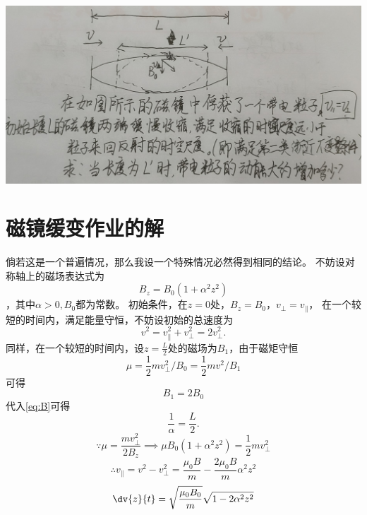 
\includegraphics[width=\textwidth]{figures/2022-10-21T120911+0800.png}
\section{磁镜缓变作业的解}
倘若这是一个普遍情况，那么我设一个特殊情况必然得到相同的结论。
不妨设对称轴上的磁场表达式为
\begin{equation}
B_z = B_0 (1 + \alpha^2 z^2)
\label{eq:B}
\end{equation}
，其中\(\alpha>0, B_0\)都为常数。
初始条件，在\(z=0\)处，\(B_z = B_0\)，\( v_\perp = v_\parallel\)，
在一个较短的时间内，满足能量守恒，不妨设初始的总速度为
\begin{equation}
  v^2 = v_\parallel^2 + v_\perp^2 = 2 v_\perp^2.
\end{equation}
同样，在一个较短的时间内，设\(z=\frac{L}{2}\)处的磁场为\(B_1\)，由于磁矩守恒
\begin{equation}
  \mu = \frac{1}{2} m v_\perp^2 \big/ B_0 =
\frac{1}{2} m v^2 \big/ B_1 
\end{equation}
可得
\begin{equation}
  B_1 = 2 B_0
\end{equation}
代入\cref{eq:B}可得
\begin{equation}
  \frac{1}{\alpha} = \frac{L}{2}.
  \label{eq:L}
\end{equation}
\begin{equation}
 \because \mu = \frac{m v_\perp^2}{2 B_z} \implies \mu B_0 ( 1 + \alpha^2 z^2 ) = \frac{1}{2} m v_\perp^2
\end{equation}
\begin{equation}
  \therefore v_\parallel = v^2 - v_\perp^2 = \frac{\mu_0 B}{m} - \frac{2 \mu_0 B}{m} \alpha^2 z^2
\end{equation}
\begin{equation}
  \dv{z}{t} = \sqrt{\frac{\mu_0 B_0}{m}} \sqrt{1 - 2 \alpha^2 z^2}
\end{equation}
